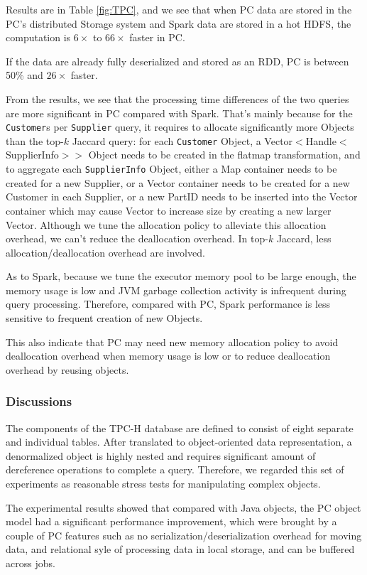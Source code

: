 Results are in Table \ref{fig:TPC},  and we see that when PC data are
stored in the PC's distributed Storage system and Spark data
are stored in
a hot HDFS, the computation is $6\times$ to $66\times$ faster in PC.  

If the data are already
fully deserialized and stored as an RDD, PC is 
between 50\% and $26\times$ faster.

From the results, we see that the processing time differences of the
two queries are more significant in PC compared with Spark. That's
mainly because for the \texttt{Customer}s per \texttt{Supplier} query,
it requires to allocate significantly more Objects than the top-$k$
Jaccard query: for each \texttt{Customer} Object, a
Vector$<$Handle$<$SupplierInfo$>$$>$ Object needs to be created in the
flatmap transformation, and to aggregate each \texttt{SupplierInfo}
Object, either a Map container needs to be created for a new Supplier,
or a Vector container needs to be created for a new Customer in each
Supplier, or a new PartID needs to be inserted into the Vector
container which may cause Vector to increase size by creating a new
larger Vector. Although we tune the allocation policy to alleviate
this allocation overhead, we can't reduce the deallocation
overhead. In top-$k$ Jaccard, less allocation/deallocation overhead
are involved.

As to Spark, because we tune the executor memory pool to be large
enough, the memory usage is low and JVM garbage collection activity is infrequent during query
processing. 
Therefore, compared with PC, Spark performance is less
sensitive to frequent creation of new Objects. 

This also indicate that PC may need new memory allocation policy to
avoid deallocation overhead when memory usage is low or to reduce
deallocation overhead by reusing objects.


\subsubsection{Discussions} 
The components of the TPC-H database are defined to
consist of eight separate and individual tables. After translated to
object-oriented data representation, a denormalized object is highly
nested and requires significant amount of dereference
operations to complete a query. Therefore, we regarded this set of
experiments as reasonable stress
tests for manipulating complex objects. 

The experimental results showed that
compared with Java objects, the PC
object model had a significant performance improvement, which were
brought by a couple of PC features such
as no serialization/deserialization overhead for moving data, and
relational syle of processing data in local storage, and can be
buffered across jobs.

